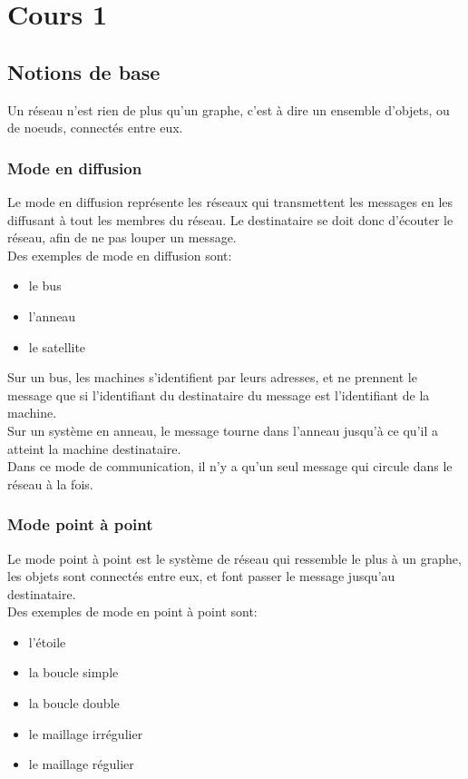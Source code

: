 \section{Cours 1}
\subsection{Notions de base}

Un réseau n'est rien de plus qu'un graphe, c'est à dire un ensemble d'objets, ou de noeuds, connectés entre eux.

\subsubsection{Mode en diffusion}
Le mode en diffusion représente les réseaux qui transmettent les messages en les diffusant à tout les membres
du réseau. Le destinataire se doit donc d'écouter le réseau, afin de ne pas louper un message.\\
Des exemples de mode en diffusion sont:
\begin{itemize}
	\item le bus
	\item l'anneau
	\item le satellite
\end{itemize}
Sur un bus, les machines s'identifient par leurs adresses, et ne prennent le message que si l'identifiant du
destinataire du message est l'identifiant de la machine.\\
Sur un système en anneau, le message tourne dans l'anneau jusqu'à ce qu'il a atteint la machine destinataire.\\
Dans ce mode de communication, il n'y a qu'un seul message qui circule dans le réseau à la fois.

\subsubsection{Mode point à point}
Le mode point à point est le système de réseau qui ressemble le plus à un graphe, les objets sont connectés
entre eux, et font passer le message jusqu'au destinataire.\\
Des exemples de mode en point à point sont:
\begin{itemize}
	\item l'étoile
	\item la boucle simple
	\item la boucle double
	\item le maillage irrégulier
	\item le maillage régulier
\end{itemize}

